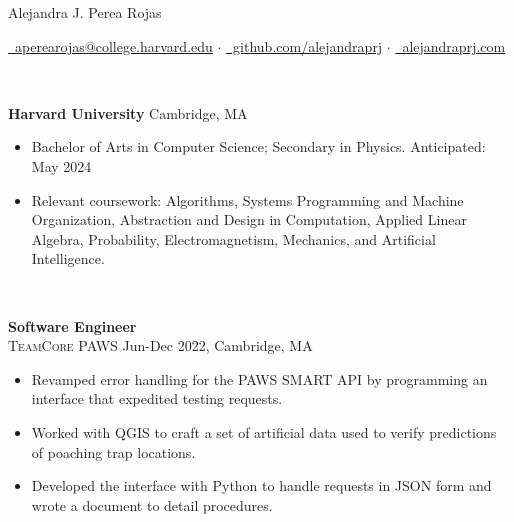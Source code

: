 \documentclass[11pt]{article}
\begin{document}
  \centerline{\Large{Alejandra J. Perea Rojas}}\vspace{1mm}

  \centerline{
    \href{mailto:aperearojas@college.harvard.edu}{\faEnvelopeO~aperearojas@college.harvard.edu} 
    $\cdot$ \href{https://github.com/alejandraprj}{\faGithub~github.com/alejandraprj}
    $\cdot$ \href{https://alejandraprj.com}{\faGlobe~alejandraprj.com}
  }\vspace{2mm}

  \vspace{-7pt}\\
  \noindent\makebox[\linewidth]{\rule{7.5in}{0.3pt}}

  \noindent \textbf{Harvard University} \hfill Cambridge, MA
    \begin{itemize}[itemsep=-.4em, leftmargin=1em]\vspace{-2mm}
        \item Bachelor of Arts in Computer Science; Secondary in Physics. \hfill Anticipated: May 2024
        \item Relevant coursework: 
          Algorithms, 
          Systems Programming and Machine Organization,
          Abstraction and Design in Computation, 
          Applied Linear Algebra, Probability,
          Electromagnetism, Mechanics, 
          and Artificial Intelligence.
    \end{itemize}

  \vspace{-7pt}\\
  \noindent\makebox[\linewidth]{\rule{7.5in}{0.3pt}}

    \noindent \textbf{Software Engineer}\\
    \textsc{{TeamCore PAWS}} \hfill Jun-Dec 2022, Cambridge, MA
    \begin{itemize}[itemsep=-.4em, leftmargin=1em]\vspace{-2mm}
      \item Revamped error handling for the PAWS SMART API by programming an interface that expedited testing requests. 
      \item Worked with QGIS to craft a set of artificial data used to verify predictions of poaching trap locations.
      \item Developed the interface with Python to handle requests in JSON form and wrote a document to detail procedures.
    \end{itemize}
    
\end{document}
